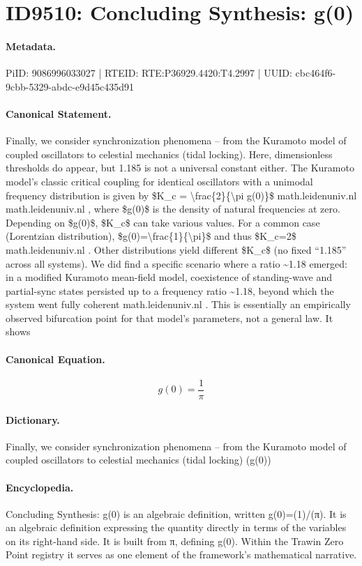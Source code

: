 \section*{ID9510: Concluding Synthesis: g(0)}
\paragraph{Metadata.}
PiID: 9086996033027 | RTEID: RTE:P36929.4420:T4.2997 | UUID: cbc464f6-9cbb-5329-abdc-e9d45c435d91

\paragraph{Canonical Statement.}
Finally, we consider synchronization phenomena – from the Kuramoto model of coupled oscillators to celestial mechanics (tidal locking). Here, dimensionless thresholds do appear, but 1.185 is not a universal constant either. The Kuramoto model’s classic critical coupling for identical oscillators with a unimodal frequency distribution is given by \$K\_c = \textbackslash{}frac\{2\}\{\textbackslash{}pi g(0)\}\$ math.leidenuniv.nl math.leidenuniv.nl , where \$g(0)\$ is the density of natural frequencies at zero. Depending on \$g(0)\$, \$K\_c\$ can take various values. For a common case (Lorentzian distribution), \$g(0)=\textbackslash{}frac\{1\}\{\textbackslash{}pi\}\$ and thus \$K\_c=2\$ math.leidenuniv.nl . Other distributions yield different \$K\_c\$ (no fixed “1.185” across all systems). We did find a specific scenario where a ratio \textasciitilde{}1.18 emerged: in a modified Kuramoto mean-field model, coexistence of standing-wave and partial-sync states persisted up to a frequency ratio \textasciitilde{}1.18, beyond which the system went fully coherent math.leidenuniv.nl . This is essentially an empirically observed bifurcation point for that model’s parameters, not a general law. It shows

\paragraph{Canonical Equation.}
\[
g(0)=\frac{1}{\pi}
\]

\paragraph{Dictionary.}
Finally, we consider synchronization phenomena – from the Kuramoto model of coupled oscillators to celestial mechanics (tidal locking) (g(0))

\paragraph{Encyclopedia.}
Concluding Synthesis: g(0) is an algebraic definition, written g(0)=(1)/(π). It is an algebraic definition expressing the quantity directly in terms of the variables on its right-hand side. It is built from π, defining g(0). Within the Trawin Zero Point registry it serves as one element of the framework's mathematical narrative.
